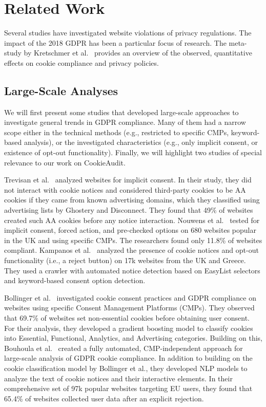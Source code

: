 \chapter{Related Work}

Several studies have investigated website violations of privacy regulations.
The impact of the 2018 GDPR has been a particular focus of research.
The meta-study by Kretschmer et al.~\cite{kretschmer2021cookie} provides an overview of the observed, quantitative effects on cookie compliance and privacy policies.

\section{Large-Scale Analyses}
We will first present some studies that developed large-scale approaches to investigate general trends in GDPR compliance. 
Many of them had a narrow scope either in the technical methods (e.g., restricted to specific CMPs, keyword-based analysis), or the investigated characteristics (e.g., only implicit consent, or existence of opt-out functionality).
Finally, we will highlight two studies of special relevance to our work on CookieAudit. 

Trevisan et al.~\cite{trevisan2019cookielaw} analyzed websites for implicit consent.
In their study, they did not interact with cookie notices and considered third-party cookies to be AA cookies if they came from known advertising domains, which they classified using advertising lists by Ghostery and Disconnect.
They found that 49\% of websites created such AA cookies before any notice interaction.
Nouwens et al.~\cite{nouwens2020dark} tested for implicit consent, forced action, and pre-checked options on 680 websites popular in the UK and using specific CMPs. 
The researchers found only 11.8\% of websites compliant.
Kampanos et al.~\cite{kampanos2021accept} analyzed the presence of cookie notices and opt-out functionality (i.e., a reject button) on 17k websites from the UK and Greece.
They used a crawler with automated notice detection based on EasyList selectors and keyword-based consent option detection.

Bollinger et al.~\cite{bollinger2022automating} investigated cookie consent practices and GDPR compliance on websites using specific Consent Management Platforms (CMPs). 
They observed that 69.7\% of websites set non-essential cookies before obtaining user consent. 
For their analysis, they developed a gradient boosting model to classify cookies into Essential, Functional, Analytics, and Advertising categories.
Building on this, Bouhoula et al.~\cite{bouhoula2023automated} created a fully automated, CMP-independent approach for large-scale analysis of GDPR cookie compliance. 
In addition to building on the cookie classification model by Bollinger et al., they developed NLP models to analyze the text of cookie notices and their interactive elements. 
In their comprehensive set of 97k popular websites targeting EU users, they found that 65.4\% of websites collected user data after an explicit rejection.

